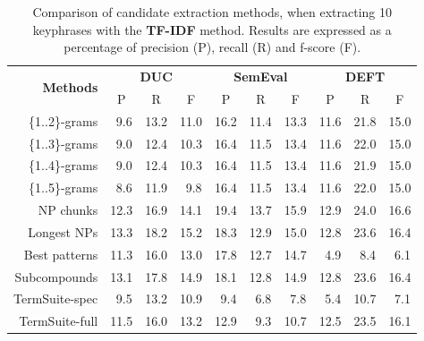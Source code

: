     \begin{table}[h]
      \centering
      \begin{tabular}{rccccccccc}
        \toprule
        \multirow{2}{*}[-2pt]{\textbf{Methods}} & \multicolumn{3}{c}{\textbf{DUC}} & \multicolumn{3}{c}{\textbf{SemEval}} & \multicolumn{3}{c}{\textbf{DEFT}}\\
        \cmidrule(r){2-4}\cmidrule(lr){5-7}\cmidrule(l){8-10}
        & P & R & F & P & R & F & P & R & F\\
        \midrule
        \{1..2\}-grams & ${~~}$9.6 & 13.2 & 11.0 & 16.2 & 11.4 & 13.3 & 11.6 & 21.8 & 15.0\\
        \{1..3\}-grams & ${~~}$9.0 & 12.4 & 10.3 & 16.4 & 11.5 & 13.4 & 11.6 & 22.0 & 15.0\\
        \{1..4\}-grams & ${~~}$9.0 & 12.4 & 10.3 & 16.4 & 11.5 & 13.4 & 11.6 & 21.9 & 15.0\\
        \{1..5\}-grams & ${~~}$8.6 & 11.9 & $~~$9.8 & 16.4 & 11.5 & 13.4 & 11.6 & 22.0 & 15.0\\
        NP chunks & 12.3 & 16.9 & 14.1 & 19.4 & 13.7 & 15.9 & 12.9 & 24.0 & 16.6\\
        Longest NPs & 13.3 & 18.2 & 15.2 & 18.3 & 12.9 & 15.0 & 12.8 & 23.6 & 16.4\\
        Best patterns & 11.3 & 16.0 & 13.0 & 17.8 & 12.7 & 14.7 & $~~$4.9 & $~~$8.4 & $~~$6.1\\
        Subcompounds & 13.1 & 17.8 & 14.9 &18.1 & 12.8 & 14.9 & 12.8 & 23.6 & 16.4\\
        TermSuite-spec & $~~$9.5 & 13.2 & 10.9 & ${~~}$9.4 & ${~~}$6.8 & ${~~}$7.8 & ${~~}$5.4 & 10.7 & ${~~}$7.1\\
        TermSuite-full & 11.5 & 16.0 & 13.2 & 12.9 & ${~~}$9.3 & 10.7 & 12.5 & 23.5 & 16.1\\
        \bottomrule
      \end{tabular}
      \caption{Comparison of candidate extraction methods, when extracting 10
               keyphrases with the \textbf{TF-IDF} method. Results are expressed
               as a percentage of precision (P), recall (R) and f-score (F).
               \label{tab:keyphrase_extraction_results}}
    \end{table}

